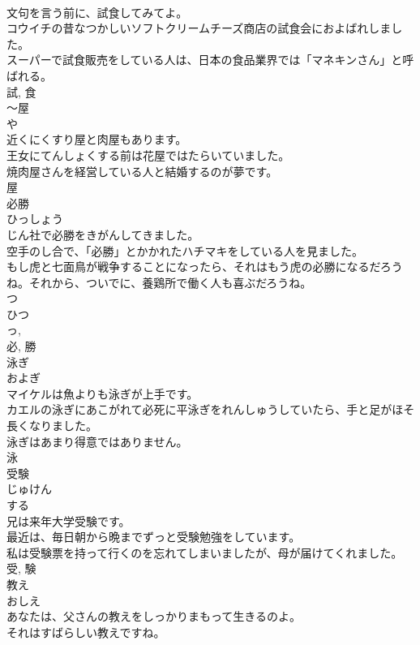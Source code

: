 \documentclass[8pt]{extreport}
\begin{document}
\begin{CJK}{UTF8}{min}
\\	文句を言う前に、試食してみてよ。	
\\	コウイチの昔なつかしいソフトクリームチーズ商店の試食会におよばれしました。	
\\	スーパーで試食販売をしている人は、日本の食品業界では「マネキンさん」と呼ばれる。	
\\	試, 食	
\\	〜屋	
\\	や	
\\	近くにくすり屋と肉屋もあります。	
\\	王女にてんしょくする前は花屋ではたらいていました。	
\\	焼肉屋さんを経営している人と結婚するのが夢です。	
\\	屋	
\\	必勝	
\\	ひっしょう	
\\	じん社で必勝をきがんしてきました。	
\\	空手のし合で、「必勝」とかかれたハチマキをしている人を見ました。	
\\	もし虎と七面鳥が戦争することになったら、それはもう虎の必勝になるだろうね。それから、ついでに、養鶏所で働く人も喜ぶだろうね。	
\\	つ 
\\	ひつ 
\\	っ, 
\\	必, 勝	
\\	泳ぎ	
\\	およぎ	
\\	マイケルは魚よりも泳ぎが上手です。	
\\	カエルの泳ぎにあこがれて必死に平泳ぎをれんしゅうしていたら、手と足がほそ長くなりました。	
\\	泳ぎはあまり得意ではありません。	
\\	泳	
\\	受験	
\\	じゅけん	
\\	する 
\\	兄は来年大学受験です。	
\\	最近は、毎日朝から晩までずっと受験勉強をしています。	
\\	私は受験票を持って行くのを忘れてしまいましたが、母が届けてくれました。	
\\	受, 験	
\\	教え	
\\	おしえ	
\\	あなたは、父さんの教えをしっかりまもって生きるのよ。	
\\	それはすばらしい教えですね。	

\end{CJK}
\end{document}
